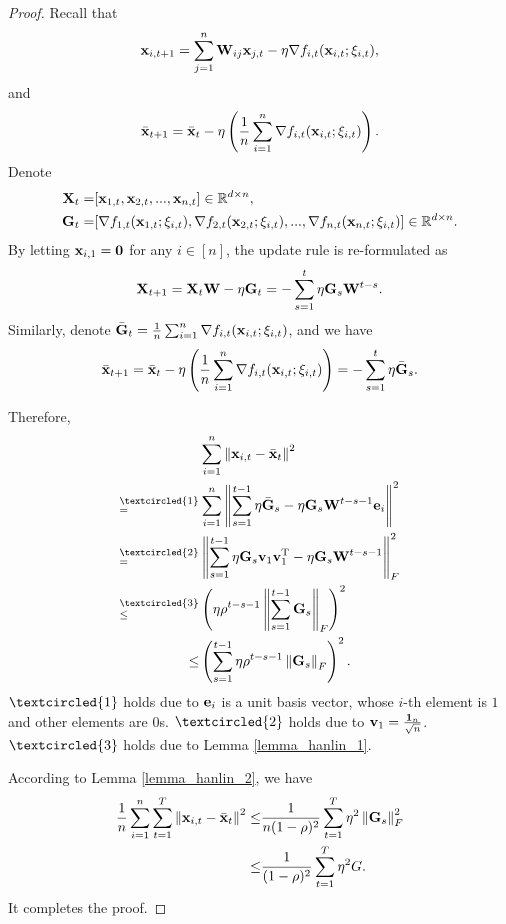 \documentclass{article}
\begin{document}
\begin{proof}


Recall that 
\begin{align}
\nonumber
{\bf x}_{i,t+1} = \sum_{j=1}^n {\bf W}_{ij}{\bf x}_{j,t} - \eta \nabla f_{i,t}({\bf x}_{i,t};\xi_{i,t}),
\end{align} and 
\begin{align}
\nonumber
\bar{{\bf x}}_{t+1} = \bar{{\bf x}}_t - \eta \left( \frac{1}{n}\sum_{i=1}^n \nabla f_{i,t}({\bf x}_{i,t};\xi_{i,t}) \right).
\end{align} Denote 
\begin{align}
\nonumber
{\bf X}_t = &  [{\bf x}_{1,t}, {\bf x}_{2,t}, ..., {\bf x}_{n,t}] \in \mathbb{R}^{d\times n}, \\ \nonumber
{\bf G}_t = & [\nabla f_{1,t}({\bf x}_{1,t};\xi_{i,t}), \nabla f_{2,t}({\bf x}_{2,t};\xi_{i,t}), ..., \nabla f_{n,t}({\bf x}_{n,t};\xi_{i,t})] \in \mathbb{R}^{d\times n}.
\end{align} By letting ${\bf x}_{i,1} = {\bf 0}$ for any $i\in[n]$, the update rule is re-formulated as 
\begin{align}
\nonumber
{\bf X}_{t+1} = {\bf X}_t {\bf W} - \eta {\bf G}_t = - \sum_{s=1}^t \eta {\bf G}_s {\bf W}^{t-s}. 
\end{align} Similarly, denote $\bar{{\bf G}}_t = \frac{1}{n}\sum_{i=1}^n \nabla f_{i,t}({\bf x}_{i,t};\xi_{i,t})$, and we have
\begin{align}
\bar{{\bf x}}_{t+1} = \bar{{\bf x}}_t - \eta \left( \frac{1}{n}\sum_{i=1}^n \nabla f_{i,t}({\bf x}_{i,t};\xi_{i,t}) \right) = - \sum_{s=1}^t \eta \bar{{\bf G}}_s. 
\end{align}


Therefore, 
\begin{align}
\nonumber
& \sum_{i=1}^n \lrnorm{\x_{i,t} - \bar{\x}_t}^2 \\ \nonumber
\refabovecir{=}{\textcircled{1}} & \sum_{i=1}^n \lrnorm{ \sum_{s=1}^{t-1} \eta \bar{\G}_s - \eta \G_s \W^{t-s-1}\e_i }^2   \\ \nonumber
\refabovecir{=}{\textcircled{2}} & \lrnorm{ \sum_{s=1}^{t-1} \eta \G_s\v_1 \v_1\Tr - \eta \G_s \W^{t-s-1} }^2_F   \\ \nonumber
\refabovecir{\le}{\textcircled{3}} & \lrincir{ \eta \rho^{t-s-1} \lrnorm{\sum_{s=1}^{t-1}\G_s}_F}^2 \\ \nonumber
\le & \lrincir{ \sum_{s=1}^{t-1} \eta \rho^{t-s-1} \lrnorm{\G_s}_F}^2.
\end{align} $\textcircled{1}$ holds due to ${\bf e}_i$ is a unit basis vector, whose $i$-th element is $1$ and other elements are $0$s. $\textcircled{2}$ holds due to ${\bf v}_1 = \frac{{\bf 1}_n}{\sqrt{n}}$. $\textcircled{3}$ holds due to Lemma \ref{lemma_hanlin_1}. 

According to Lemma \ref{lemma_hanlin_2}, we have
\begin{align}
\nonumber
\frac{1}{n}\sum_{i=1}^n \sum_{t=1}^T \left\lVert{\bf x}_{i,t} - \bar{{\bf x}}_t\right\rVert^2 \le & \frac{1}{n(1-\rho)^2} \sum_{t=1}^T \eta^2 \left\lVert{\bf G}_s\right\rVert_F^2 \\ \nonumber
\le & \frac{1}{(1-\rho)^2} \sum_{t=1}^T \eta^2 G.
\end{align}
It completes the proof.


\end{proof}
\end{document}
